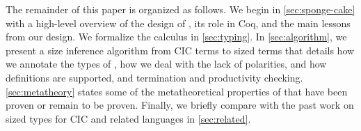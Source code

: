 The remainder of this paper is organized as follows.
We begin in \autoref{sec:sponge-cake} with a high-level overview of the design of \lang, its role in Coq, and the main lessons from our design.
We formalize the calculus \lang in \autoref{sec:typing}.
In \autoref{sec:algorithm}, we present a size inference algorithm from CIC terms to sized \lang terms that details how we annotate the types of \cofixpoints, how we deal with the lack of polarities, and how definitions are supported, and termination and productivity checking.
\autoref{sec:metatheory} states some of the metatheoretical properties of \lang that have been proven or remain to be proven.
Finally, we briefly compare with the past work on sized types for CIC and related languages in \autoref{sec:related}.

